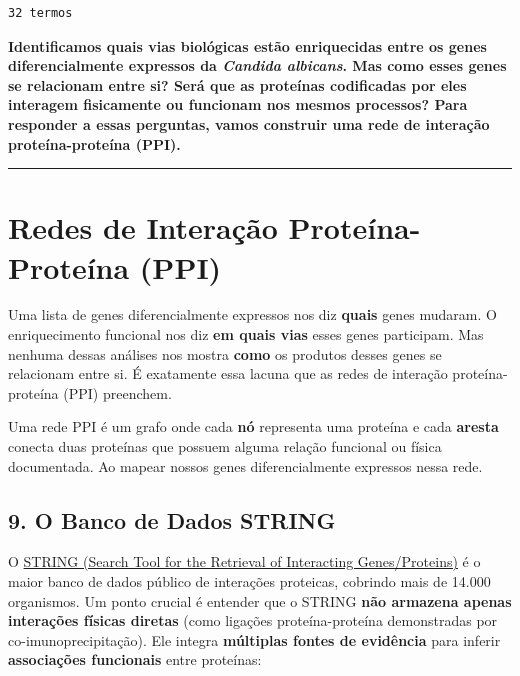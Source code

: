 \documentclass[
  letterpaper,
  DIV=11,
  numbers=noendperiod]{scrreprt}
\begin{document}
\begin{verbatim}
32 termos
\end{verbatim}

\textbf{Identificamos quais vias biológicas estão enriquecidas entre os
genes diferencialmente expressos da \emph{Candida albicans}. Mas como
esses genes se relacionam entre si? Será que as proteínas codificadas
por eles interagem fisicamente ou funcionam nos mesmos processos? Para
responder a essas perguntas, vamos construir uma rede de interação
proteína-proteína (PPI).}

\begin{center}\rule{0.5\linewidth}{0.5pt}\end{center}


\chapter{Redes de Interação Proteína-Proteína
(PPI)}\label{redes-de-interauxe7uxe3o-proteuxedna-proteuxedna-ppi}

Uma lista de genes diferencialmente expressos nos diz \textbf{quais}
genes mudaram. O enriquecimento funcional nos diz \textbf{em quais vias}
esses genes participam. Mas nenhuma dessas análises nos mostra
\textbf{como} os produtos desses genes se relacionam entre si. É
exatamente essa lacuna que as redes de interação proteína-proteína (PPI)
preenchem.

Uma rede PPI é um grafo onde cada \textbf{nó} representa uma proteína e
cada \textbf{aresta} conecta duas proteínas que possuem alguma relação
funcional ou física documentada. Ao mapear nossos genes diferencialmente
expressos nessa rede.

\section{9. O Banco de Dados STRING}\label{o-banco-de-dados-string}

O \href{https://string-db.org/}{STRING (Search Tool for the Retrieval of
Interacting Genes/Proteins)} é o maior banco de dados público de
interações proteicas, cobrindo mais de 14.000 organismos. Um ponto
crucial é entender que o STRING \textbf{não armazena apenas interações
físicas diretas} (como ligações proteína-proteína demonstradas por
co-imunoprecipitação). Ele integra \textbf{múltiplas fontes de
evidência} para inferir \textbf{associações funcionais} entre proteínas:
\end{document}
